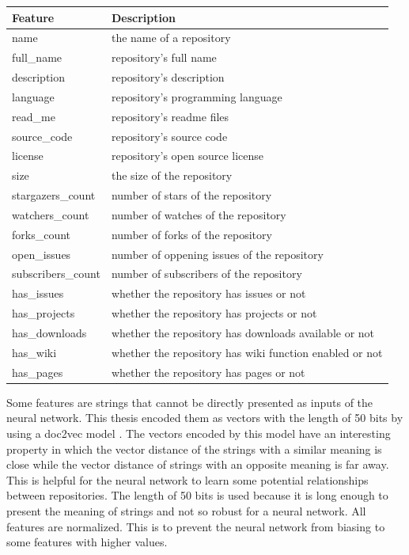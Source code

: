 \documentclass[11pt,twoside]{report}
\begin{document}
\begin{center}
    \begin{tabular}{| l | l |}
    \hline
    Feature & Description \\ \hline
    name & the name of a repository \\ \hline
    full\_name & repository's full name \\ \hline
    description & repository's description \\ \hline
    language & repository's programming language \\ \hline
    read\_me & repository's readme files \\ \hline
    source\_code & repository's source code \\ \hline
    license & repository's open source license \\ \hline
    size & the size of the repository \\ \hline
    stargazers\_count & number of stars of the repository \\ \hline
    watchers\_count & number of watches of the repository \\ \hline
    forks\_count & number of forks of the repository \\ \hline
    open\_issues & number of oppening issues of the repository \\ \hline
    subscribers\_count & number of subscribers of the repository \\ \hline
    has\_issues & whether the repository has issues or not \\ \hline
    has\_projects & whether the repository has projects or not \\ \hline
    has\_downloads & whether the repository has downloads available or not \\ \hline
    has\_wiki & whether the repository has wiki function enabled or not \\ \hline
    has\_pages & whether the repository has pages or not \\ \hline
    \end{tabular}
    \label{tab:repo_features}
\end{center}

Some features are strings that cannot be directly presented as inputs of the neural network. This thesis encoded them as vectors with the length of 50 bits by using a doc2vec model \cite{rehurek_lrec}. The vectors encoded by this model have an interesting property in which the vector distance of the strings with a similar meaning is close while the vector distance of strings with an opposite meaning is far away. This is helpful for the neural network to learn some potential relationships between repositories. The length of 50 bits is used because it is long enough to present the meaning of strings and not so robust for a neural network. All features are normalized. This is to prevent the neural network from biasing to some features with higher values.
\end{document}
